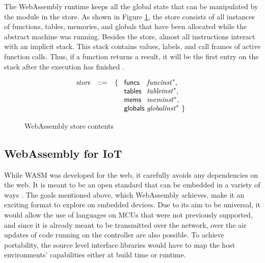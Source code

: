 The WebAssembly runtime keeps all the global state that can be manipulated by the module in the store. As shown in Figure \ref{fig:store_content}, the store consists of all instances of functions, tables, memories, and globals that have been allocated while the abstract machine was running. Besides the store, almost all instructions interact with an implicit stack. This stack contains values, labels, and call frames of active function calls. Thus, if a function returns a result, it will be the first entry on the stack after the execution has finished \autocite{noauthor_runtime_nodate}.

\begin{figure}[h]
    \begin{equation}\nonumber
        \begin{split}
            \begin{array}{llll}
            \mathit{store} &::=& \{~
            \begin{array}[t]{l@{~}ll}
                \mathsf{funcs} & \mathit{funcinst}^\ast, \\
                \mathsf{tables} & \mathit{tableinst}^\ast, \\
                \mathsf{mems} & \mathit{meminst}^\ast, \\
                \mathsf{globals} & \mathit{globalinst}^\ast ~\} \\
            \end{array}
            \end{array}
        \end{split}
    \end{equation}
    \caption{WebAssembly store contents}
    \label{fig:store_content}
\end{figure}

\subsection{WebAssembly for IoT}

While WASM was developed for the web, it carefully avoids any dependencies on the web. It is meant to be an open standard that can be embedded in a variety of ways \autocite{noauthor_non-web_nodate}. The goals mentioned above, which WebAssembly achieves, make it an exciting format to explore on embedded devices. Due to its aim to be universal, it would allow the use of languages on MCUs that were not previously supported, and since it is already meant to be transmitted over the network, over the air updates of code running on the controller are also possible. To achieve portability, the source level interface libraries would have to map the host environments' capabilities either at build time or runtime.


